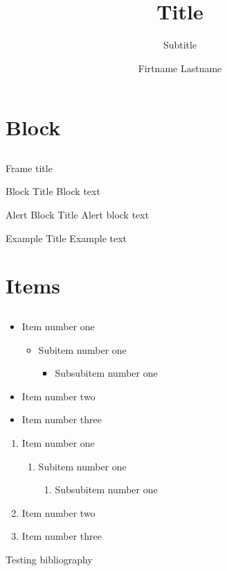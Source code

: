 \documentclass[12pt,a4paper,compress]{beamer}
\title{Title}
\author{Firtname Lastname}
\subtitle{Subtitle}
\institute{Institue}
\begin{document}
\begin{frame}[plain]
	\maketitle
\end{frame}

\section{Block}
\subsection{}
\begin{frame}{Frame title}
	\begin{block}{Block Title}
		Block text
	\end{block}
	\begin{alertblock}{Alert Block Title}
		Alert block text
	\end{alertblock}
	\begin{example}{Example Title}
		Example text
	\end{example}
\end{frame}

\section{Items}
\subsection{}
\begin{frame}
	\begin{itemize}
		\item Item number one
		\begin{itemize}
			\item Subitem number one
			\begin{itemize}
				\item Subsubitem number one
			\end{itemize}
		\end{itemize}
		\item Item number two
		\item Item number three
	\end{itemize}
	\begin{enumerate}
		\item Item number one
		\begin{enumerate}
			\item Subitem number one
			\begin{enumerate}
				\item Subsubitem number one
			\end{enumerate}
		\end{enumerate}
		\item Item number two
		\item Item number three
	\end{enumerate}
\end{frame}

\begin{frame}
	Testing bibliography \cite{article2014test}
\end{frame}

\begin{frame}
	
\end{frame}
\end{document}
